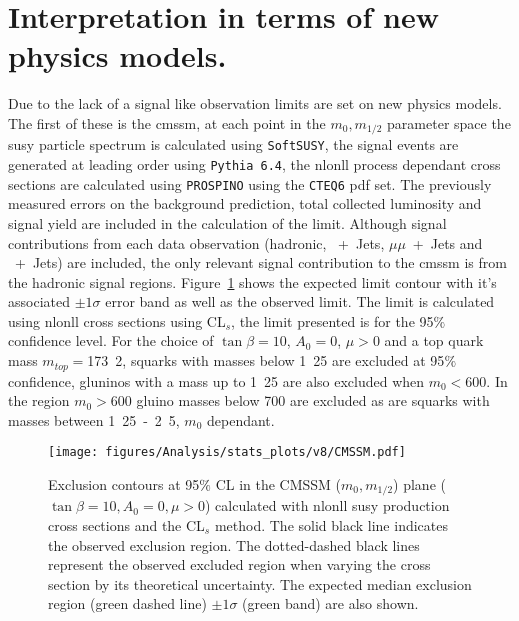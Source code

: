 \section{Interpretation in terms of new physics models.} %
\label{cha:interpretation_in_terms_of_new_physics_models_}
Due to the lack of a signal like observation limits are set on new physics models. The first of these is the \ac{cmssm}, at each point in the $m_{0}, m_{1/2}$ parameter space the \ac{susy} particle spectrum is calculated using \texttt{SoftSUSY}\cite{Allanach:2001kg}, the signal events are generated at leading order using \texttt{Pythia 6.4}\cite{pythia}, the \ac{nlonll} process dependant cross sections are calculated using \texttt{PROSPINO}\cite{Beenakker:1996ch} using the \texttt{CTEQ6}\cite{cteq6.1} \ac{pdf} set. The previously measured errors on the background prediction, total collected luminosity and signal yield are included in the calculation of the limit. Although signal contributions from each data observation (hadronic, \Pmu~+~Jets, $\mu\mu$~+~Jets and \Pphoton~+~Jets) are included, the only relevant signal contribution to the \ac{cmssm} is from the hadronic signal regions.
Figure~\ref{fig:cmssm-limit} shows the expected limit contour with it's associated $\pm1\sigma$ error band as well as the observed limit. The limit is calculated using \ac{nlonll} cross sections using CL$_s$\cite{cls-pdg}, the limit presented is for the 95$\%$ confidence level. For the choice of $\tan\beta = 10$, $A_0 = $\unit{0}{\GeV}, $\mu > 0$ and a top quark mass $m_{top} = $\unit{173.2}{\GeV}, squarks with masses below \unit{1.25}{\TeV} are excluded at 95$\%$ confidence, gluninos with a mass up to \unit{1.25}{\TeV} are also excluded when $m_{0} < $\unit{600}{\GeV}. In the region $m_{0} > $\unit{600}{\GeV} gluino masses below \unit{700}{\GeV} are excluded as are squarks with masses between \unit{1.25-2.5}{\TeV}, $m_{0}$ dependant.

\begin{figure}[h!]
  \begin{center}
    \texttt{[image: figures/Analysis/stats\_plots/v8/CMSSM.pdf]}
    \caption{\label{fig:cmssm-limit} Exclusion contours at 95$\%$ CL in
      the CMSSM ($m_0, m_{1/2}$) plane ($\tan \beta = 10, A_0 = 0, \mu
      > 0$) calculated with \ac{nlonll} \ac{susy} production cross sections and
      the CL$_{s}$ method. The solid black line indicates the observed
      exclusion region. The dotted-dashed black lines represent the
      observed excluded region when varying the cross section by its
      theoretical uncertainty. The expected median exclusion region
      (green dashed line) $\pm 1 \sigma$ (green band) are also
      shown. }
  \end{center}
\end{figure}


